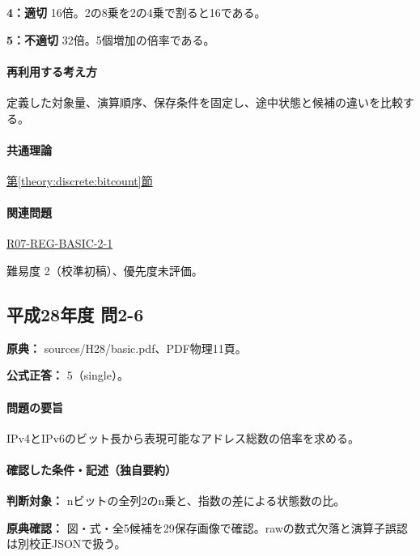 \noindent\textbf{4：適切} 16倍。2の8乗を2の4乗で割ると16である。\par

\noindent\textbf{5：不適切} 32倍。5個増加の倍率である。\par

\paragraph{再利用する考え方} 定義した対象量、演算順序、保存条件を固定し、途中状態と候補の違いを比較する。

\paragraph{共通理論} \hyperref[theory:discrete:bitcount]{第\ref*{theory:discrete:bitcount}節}

\paragraph{関連問題} \hyperref[q:r07-reg-basic-2-1]{R07-REG-BASIC-2-1}

\par 難易度 2（校準初稿）、優先度未評価。

\subsection{平成28年度 問2-6}
\label{q:h28-reg-basic-2-6}

\noindent\textbf{原典：} sources/H28/basic.pdf、PDF物理11頁。

\textbf{公式正答：} 5（single）。

\paragraph{問題の要旨} IPv4とIPv6のビット長から表現可能なアドレス総数の倍率を求める。

\paragraph{確認した条件・記述（独自要約）}\mbox{}\par

\noindent\textbf{判断対象：} nビットの全列2のn乗と、指数の差による状態数の比。\par

\noindent\textbf{原典確認：} 図・式・全5候補を29保存画像で確認。rawの数式欠落と演算子誤認は別校正JSONで扱う。\par

